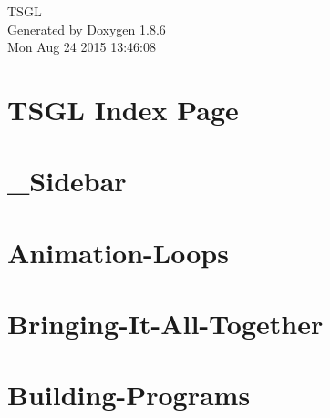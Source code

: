 \documentclass[twoside]{book}
\newcommand{\clearemptydoublepage}{%
  \newpage{\pagestyle{empty}\cleardoublepage}%
}
\begin{document}
\hypersetup{pageanchor=false}
\begin{titlepage}
\vspace*{7cm}
\begin{center}%
{\Large T\-S\-G\-L }\\
\vspace*{1cm}
{\large Generated by Doxygen 1.8.6}\\
\vspace*{0.5cm}
{\small Mon Aug 24 2015 13:46:08}\\
\end{center}
\end{titlepage}
\clearemptydoublepage
\tableofcontents
\clearemptydoublepage
{}
\hypersetup{pageanchor=true}

\chapter{T\-S\-G\-L Index Page}
\label{index}\hypertarget{index}{}
\chapter{\-\_\-\-Sidebar}
\label{md__home_cpd5_workspace__t_s_g_l_docs-wiki___sidebar}
\hypertarget{md__home_cpd5_workspace__t_s_g_l_docs-wiki___sidebar}{}

\chapter{Animation-\/\-Loops}
\label{md__home_cpd5_workspace__t_s_g_l_docs-wiki__animation-_loops}
\hypertarget{md__home_cpd5_workspace__t_s_g_l_docs-wiki__animation-_loops}{}

\chapter{Bringing-\/\-It-\/\-All-\/\-Together}
\label{md__home_cpd5_workspace__t_s_g_l_docs-wiki__bringing-_it-_all-_together}
\hypertarget{md__home_cpd5_workspace__t_s_g_l_docs-wiki__bringing-_it-_all-_together}{}

\chapter{Building-\/\-Programs}
\label{md__home_cpd5_workspace__t_s_g_l_docs-wiki__building-_programs}
\hypertarget{md__home_cpd5_workspace__t_s_g_l_docs-wiki__building-_programs}{}

\end{document}
